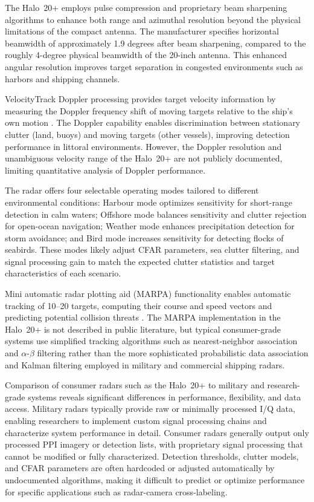 The Halo~20+ employs pulse compression and proprietary beam sharpening algorithms to enhance both range and azimuthal resolution beyond the physical limitations of the compact antenna. The manufacturer specifies horizontal beamwidth of approximately 1.9 degrees after beam sharpening, compared to the roughly 4-degree physical beamwidth of the 20-inch antenna. This enhanced angular resolution improves target separation in congested environments such as harbors and shipping channels.

VelocityTrack Doppler processing provides target velocity information by measuring the Doppler frequency shift of moving targets relative to the ship's own motion \cite{AlSharabi2021}. The Doppler capability enables discrimination between stationary clutter (land, buoys) and moving targets (other vessels), improving detection performance in littoral environments. However, the Doppler resolution and unambiguous velocity range of the Halo~20+ are not publicly documented, limiting quantitative analysis of Doppler performance.

The radar offers four selectable operating modes tailored to different environmental conditions: Harbour mode optimizes sensitivity for short-range detection in calm waters; Offshore mode balances sensitivity and clutter rejection for open-ocean navigation; Weather mode enhances precipitation detection for storm avoidance; and Bird mode increases sensitivity for detecting flocks of seabirds. These modes likely adjust CFAR parameters, sea clutter filtering, and signal processing gain to match the expected clutter statistics and target characteristics of each scenario.

Mini automatic radar plotting aid (MARPA) functionality enables automatic tracking of 10--20 targets, computing their course and speed vectors and predicting potential collision threats \cite{AlSharabi2021}. The MARPA implementation in the Halo~20+ is not described in public literature, but typical consumer-grade systems use simplified tracking algorithms such as nearest-neighbor association and $\alpha$-$\beta$ filtering rather than the more sophisticated probabilistic data association and Kalman filtering employed in military and commercial shipping radars.

Comparison of consumer radars such as the Halo~20+ to military and research-grade systems reveals significant differences in performance, flexibility, and data access. Military radars typically provide raw or minimally processed I/Q data, enabling researchers to implement custom signal processing chains and characterize system performance in detail. Consumer radars generally output only processed PPI imagery or detection lists, with proprietary signal processing that cannot be modified or fully characterized. Detection thresholds, clutter models, and CFAR parameters are often hardcoded or adjusted automatically by undocumented algorithms, making it difficult to predict or optimize performance for specific applications such as radar-camera cross-labeling.


